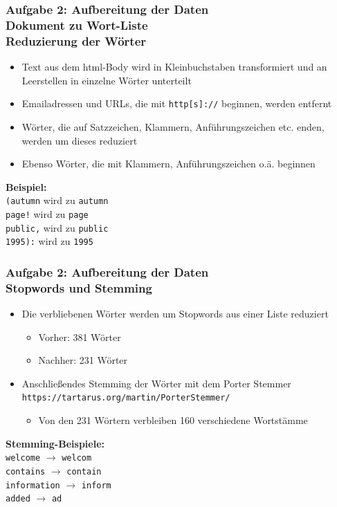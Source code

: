 \documentclass[accentcolor=tud7b,noresetcounter]{tudbeamer}
\begin{document}
	\begin{frame}
		\frametitle{Aufgabe 2: Aufbereitung der Daten\\Dokument zu Wort-Liste\\Reduzierung der Wörter}
		\begin{itemize}
			\item Text aus dem html-Body wird in Kleinbuchstaben transformiert und an Leerstellen in einzelne Wörter unterteilt
			\item Emailadressen und URLs, die mit \texttt{http[s]://} beginnen, werden entfernt
			\item Wörter, die auf Satzzeichen, Klammern, Anführungszeichen etc. enden, werden um dieses reduziert
			\item Ebenso Wörter, die mit Klammern, Anführungszeichen o.ä. beginnen
		\end{itemize}
		\textbf{Beispiel:}\\
		\texttt{(autumn} wird zu \texttt{autumn}\\
		\texttt{page!} wird zu \texttt{page}\\
		\texttt{public,} wird zu \texttt{public}\\
		\texttt{1995):} wird zu \texttt{1995}
	\end{frame}
	
	\begin{frame}
		\frametitle{Aufgabe 2: Aufbereitung der Daten\\Stopwords und Stemming}
		\begin{itemize}
			\item Die verbliebenen Wörter werden um Stopwords aus einer Liste reduziert
			\begin{itemize}
				\item Vorher: 381 Wörter
				\item Nachher: 231 Wörter
			\end{itemize}
			\item Anschließendes Stemming der Wörter mit dem Porter Stemmer\\\texttt{https://tartarus.org/martin/PorterStemmer/}
			\begin{itemize}
				\item Von den 231 Wörtern verbleiben 160 verschiedene Wortstämme
			\end{itemize}
		\end{itemize}
		\textbf{Stemming-Beispiele:}\\
			\texttt{welcome} $\rightarrow$ \texttt{welcom}\\
			\texttt{contains} $\rightarrow$ \texttt{contain}\\
			\texttt{information} $\rightarrow$ \texttt{inform}\\
			\texttt{added} $\rightarrow$ \texttt{ad}\\
			
	\end{frame}
	
\end{document}
